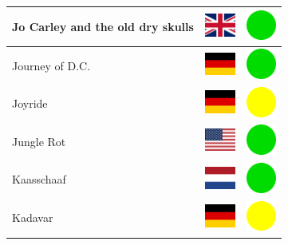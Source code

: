 \documentclass[12pt, a4paper, twoside]{report}
\begin{document}
\begin{center}
\begin{longtable}{|p{5cm}|p{2cm}|p{2cm}|}
 Jo Carley and the old dry skulls                           & \includegraphics[width=1cm]{../img/flags/gb} &   \includegraphics[width=1cm]{../likes/y} \\ \hline
 Journey of D.C.                                            & \includegraphics[width=1cm]{../img/flags/de} &   \includegraphics[width=1cm]{../likes/y} \\ \hline
 Joyride                                                    & \includegraphics[width=1cm]{../img/flags/de} &   \includegraphics[width=1cm]{../likes/m} \\ \hline
 Jungle Rot                                                 & \includegraphics[width=1cm]{../img/flags/us} &   \includegraphics[width=1cm]{../likes/y} \\ \hline
 Kaasschaaf                                                 & \includegraphics[width=1cm]{../img/flags/nl} &   \includegraphics[width=1cm]{../likes/y} \\ \hline
 Kadavar                                                    & \includegraphics[width=1cm]{../img/flags/de} &   \includegraphics[width=1cm]{../likes/m} \\ \hline

\end{longtable}
\end{center}
\end{document}
